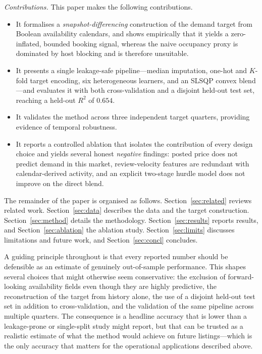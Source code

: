 \documentclass[review,12pt]{elsarticle}
\begin{document}
\emph{Contributions.} This paper makes the following contributions.
\begin{itemize}
\item It formalises a \emph{snapshot-differencing} construction of the demand
target from Boolean availability calendars, and shows empirically that it yields a
zero-inflated, bounded booking signal, whereas the naive occupancy proxy is
dominated by host blocking and is therefore unsuitable.
\item It presents a single leakage-safe pipeline---median imputation, one-hot and
$K$-fold target encoding, six heterogeneous learners, and an SLSQP convex
blend---and evaluates it with both cross-validation and a disjoint held-out test
set, reaching a held-out $R^2$ of $0.654$.
\item It validates the method across three independent target quarters, providing
evidence of temporal robustness.
\item It reports a controlled ablation that isolates the contribution of every
design choice and yields several honest \emph{negative} findings: posted price
does not predict demand in this market, review-velocity features are redundant
with calendar-derived activity, and an explicit two-stage hurdle model does not
improve on the direct blend.
\end{itemize}

The remainder of the paper is organised as follows.
Section~\ref{sec:related} reviews related work. Section~\ref{sec:data} describes
the data and the target construction. Section~\ref{sec:method} details the
methodology. Section~\ref{sec:results} reports results, and
Section~\ref{sec:ablation} the ablation study. Section~\ref{sec:limits} discusses
limitations and future work, and Section~\ref{sec:concl} concludes.

A guiding principle throughout is that every reported number should be defensible
as an estimate of genuinely out-of-sample performance. This shapes several choices
that might otherwise seem conservative: the exclusion of forward-looking
availability fields even though they are highly predictive, the reconstruction of
the target from history alone, the use of a disjoint held-out test set in addition
to cross-validation, and the validation of the same pipeline across multiple
quarters. The consequence is a headline accuracy that is lower than a leakage-prone
or single-split study might report, but that can be trusted as a realistic estimate
of what the method would achieve on future listings---which is the only accuracy
that matters for the operational applications described above.
\end{document}
